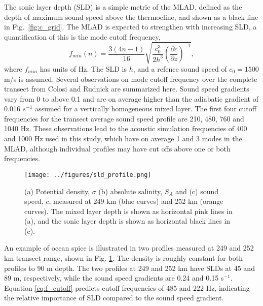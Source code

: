 \documentclass[preprint,NumberedRefs]{JASA}
\begin{document}
The sonic layer depth (SLD) is a simple metric of the MLAD, defined as the depth of maximum sound speed above the thermocline, and shown as a black line in Fig.~\ref{fig:c_grid}. The MLAD is expected to strengthen with increasing SLD, a quantification of this is the mode cutoff frequency\citep{Urick1982Prop},
\begin{equation}
    f_{min}(n) = \frac{3(4n-1)}{16} \sqrt{\frac{c_0^3}{2h^3} \left( \frac{\partial c}{\partial z} \right) ^ {-1}},
    \label{eq:f_cutoff}
\end{equation}
where $f_{min}$ has units of Hz. The SLD is $h$, and a refence sound speed of $c_0 = 1500$ m/s is assumed. Several observations on mode cutoff frequency over the complete transect from Colosi and Rudnick\cite{colosi2020observations} are summarized here. Sound speed gradients vary from 0 to above 0.1 and are on average higher than the adiabatic gradient of 0.016 $s^{-1}$ assumed for a vertically homogeneous mixed layer. The first four cutoff frequencies for the transect average sound speed profile are 210, 480, 760 and 1040 Hz. These observations lead to the acoustic simulation frequencies of 400 and 1000 Hz used in this study, which have on average 1 and 3 modes in the MLAD, although individual profiles may have cut offs above one or both frequencies.

\begin{figure}
    \texttt{[image: ../figures/sld\_profile.png]}
    \caption{\label{fig:profiles}{(a) Potential density, $\sigma$ (b) absolute salinity, $S_A$ and (c) sound speed, $c$, measured at 249 km (blue curves) and 252 km (orange curves). The mixed layer depth is shown as horizontal pink lines in (a), and the sonic layer depth is shown as horizontal black lines in (c).}}
\end{figure}

An example of ocean spice is illustrated in two profiles measured at 249 and 252 km transect range, shown in Fig. \ref{fig:profiles}. The density is roughly constant for both profiles to 90 m depth. The two profiles at 249 and 252 km have SLDs at 45 and 89 m, respectively, while the sound speed gradients are 0.24 and 0.15 s$^{-1}$. Equation \eqref{eq:f_cutoff} predicts cutoff frequencies of 485 and 222 Hz, indicating the relative importance of SLD compared to the sound speed gradient.
\end{document}
